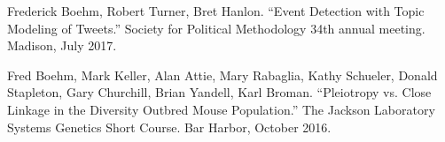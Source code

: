 \documentclass[11pt,article,oneside]{memoir}
\begin{document}
%
%
% 
%
% 
%
%
%
%
%
%
%
%
%
%
%
%



\medskip

\ind Frederick Boehm, Robert Turner, Bret Hanlon. ``Event Detection with Topic Modeling of Tweets.'' Society for Political Methodology 34th annual meeting. Madison, July 2017.

\ind Fred Boehm, Mark Keller, Alan Attie, Mary Rabaglia, Kathy Schueler, Donald Stapleton, Gary Churchill, Brian Yandell, Karl Broman. ``Pleiotropy vs. Close Linkage in the Diversity Outbred Mouse Population.'' The Jackson Laboratory Systems Genetics Short Course. Bar Harbor, October 2016.
\end{document}
